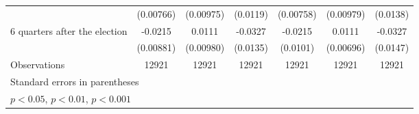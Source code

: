 \begin{table}[htbp]
\begin{tabular}{l*{6}{c}}
                    &   (0.00766)         &   (0.00975)         &    (0.0119)         &   (0.00758)         &   (0.00979)         &    (0.0138)         \\
[1em]
 6 quarters after the election&     -0.0215\sym{*}  &      0.0111         &     -0.0327\sym{*}  &     -0.0215\sym{*}  &      0.0111         &     -0.0327\sym{*}  \\
                    &   (0.00881)         &   (0.00980)         &    (0.0135)         &    (0.0101)         &   (0.00696)         &    (0.0147)         \\
\hline
Observations        &       12921         &       12921         &       12921         &       12921         &       12921         &       12921         \\
\hline\hline
\multicolumn{7}{l}{\footnotesize Standard errors in parentheses}\\
\multicolumn{7}{l}{\footnotesize \sym{*} \(p<0.05\), \sym{**} \(p<0.01\), \sym{***} \(p<0.001\)}\\
\end{tabular}
\end{table}
